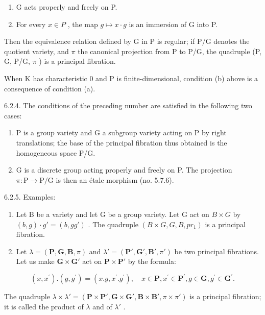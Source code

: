 \begin{enumerate}
\def\labelenumi{(\alph{enumi})}
\item
  G acts properly and freely on P.
\item
  For every \(x \in P\) , the map \(g \mapsto x \cdot g\) is an immersion of G into P.
\end{enumerate}

Then the equivalence relation defined by G in P is regular; if P/G denotes the quotient variety, and \(\pi\) the canonical projection from P to P/G, the quadruple (P, G, P/G, \(\pi\) ) is a principal fibration.

When K has characteristic 0 and P is finite-dimensional, condition (b) above is a consequence of condition (a).

6.2.4. The conditions of the preceding number are satisfied in the following two cases:

\begin{enumerate}
\def\labelenumi{(\alph{enumi})}
\item
  P is a group variety and G a subgroup variety acting on P by right translations; the base of the principal fibration thus obtained is the homogeneous space P/G.
\item
  G is a discrete group acting properly and freely on P. The projection \(\pi: \mathrm{P} \to \mathrm{P} / \mathrm{G}\) is then an étale morphism (no. 5.7.6).
\end{enumerate}

6.2.5. Examples:

\begin{enumerate}
\def\labelenumi{(\alph{enumi})}
\item
  Let B be a variety and let G be a group variety. Let G act on \(B \times G\) by \((b, g) \cdot g' = (b, gg')\) . The quadruple \((B \times G, G, B, pr_{1})\) is a principal fibration.
\item
  Let \(\lambda = (\mathbf{P}, \mathbf{G}, \mathbf{B}, \pi)\) and \(\lambda' = (\mathbf{P}', \mathbf{G}', \mathbf{B}', \pi')\) be two principal fibrations. Let us make \(\mathbf{G} \times \mathbf{G}'\) act on \(\mathbf{P} \times \mathbf{P}'\) by the formula:
\end{enumerate}

\[
(x, x ^ {\prime}). (g, g ^ {\prime}) = (x. g, x ^ {\prime}. g ^ {\prime}), \quad x \in \mathbf {P}, x ^ {\prime} \in \mathbf {P} ^ {\prime}, g \in \mathbf {G}, g ^ {\prime} \in \mathbf {G} ^ {\prime}.
\]

The quadruple \(\lambda \times \lambda' = (\mathbf{P} \times \mathbf{P}', \mathbf{G} \times \mathbf{G}', \mathbf{B} \times \mathbf{B}', \pi \times \pi')\) is a principal fibration; it is called the product of \(\lambda\) and of \(\lambda'\) .


